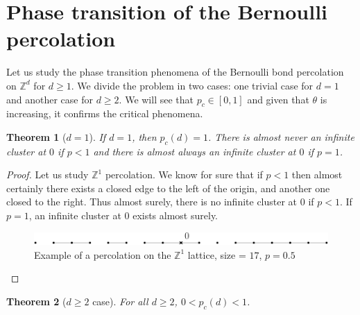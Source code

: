 \documentclass[a4paper,11pt]{article}
\theoremstyle{plain}
\newtheorem{theorem}{Theorem}[section]
\theoremstyle{definition}
\theoremstyle{remark}
\begin{document}
\section{Phase transition of the Bernoulli percolation} \label{phasetransition_section}
Let us study the phase transition phenomena of the Bernoulli bond percolation on $\mathbb{Z}^d$ for $d \geq 1$. We divide the problem in two cases: one trivial case for $d = 1$ and another case for $d \geq 2$. We will see that $p_c \in [0,1]$ and given that $\theta$ is increasing, it confirms the critical phenomena.

\begin{theorem}[$d = 1$]
  If $d = 1$, then $p_c(d) = 1$.
  There is almost never an infinite cluster at $0$ if $p < 1$ and there is almost always an infinite cluster at $0$ if $p = 1$.
\end{theorem}

\begin{proof}

Let us study $\mathbb{Z}^1$ percolation. We know for sure that if $p < 1$ then almost certainly there exists a closed edge to the left of the origin, and another one closed to the right. Thus almost surely, there is no infinite cluster at $0$ if $p < 1$. If $p = 1$,  an infinite cluster at $0$ exists almost surely.

\begin{figure}[ht]
\centering
\includegraphics{Z1lattice}
\caption{Example of a percolation on the $\mathbb{Z}^1$ lattice, size = $17$, $p = 0.5$}
\end{figure}
\end{proof}

\begin{theorem}[$d \geq 2$ case]
  For all $d \geq 2$, $0 < p_c(d) < 1$.
\end{theorem}
\end{document}
